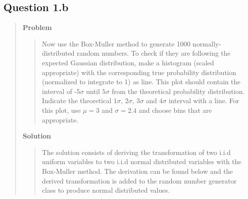 
\subsection*{\textbf{Question 1.b}}
\begin{quote}

\textbf{Problem}
\begin{quote}Now use the Box-Muller method to generate 1000 normally-distributed random numbers. To check if they are following the expected Gaussian distribution, make a histogram (scaled appropriate) with the corresponding true probability distribution (normalized to integrate to 1) as line. This plot should contain the interval of -5$\sigma$ until $5\sigma$ from the theoretical probability distribution. Indicate the theoretical $1\sigma$, $2\sigma$, $3\sigma$ and $4\sigma$ interval with a line. For this plot, use $\mu =3$ and $\sigma = 2.4$ and choose bins that are appropriate.
\end{quote}

\textbf{Solution} 



\begin{quote}
The solution consists of deriving the  transformation of two i.i.d uniform variables to two i.i.d normal distributed variables with the Box-Muller method. The derivation can be found below and the derived transformation is added to the random number generator class to produce normal distributed values.




\end{quote}
\end{quote}
